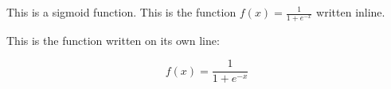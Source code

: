 \documentclass{article}
\begin{document}

This is a sigmoid function.  This is the function \(f(x) = \frac{1}{1 + e^{-x}}\) written inline.

This is the function written on its own line:

\begin{equation}
f(x) = \frac{1}{1 + e^{-x}}
\end{equation}
\end{document}
